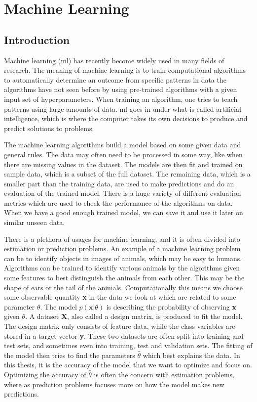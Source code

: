 \documentclass[a4paper, american, 12pt]{report}
\begin{document}
	
	\chapter{Machine Learning}
	\label{chap:Theory-Machine_learning}
	\section{Introduction}
	\label{sect:Theory-IntroML}
	Machine learning (\acrshort{ml}) has recently become widely used in many fields of research. The meaning of machine learning is to train computational algorithms to automatically determine an outcome from specific patterns in data the algorithms have not seen before by using pre-trained algorithms with a given input set of hyperparameters. When training an algorithm, one tries to teach patterns using large amounts of data. \acrshort{ml} goes in under what is called artificial intelligence, which is where the computer takes its own decisions to produce and predict solutions to problems. 
	
	The machine learning algorithms build a model based on some given data and general rules. The data may often need to be processed in some way, like when there are missing values in the dataset. The models are then fit and trained on sample data, which is a subset of the full dataset. The remaining data, which is a smaller part than the training data, are used to make predictions and do an evaluation of the trained model. There is a huge variety of different evaluation metrics which are used to check the performance of the algorithms on data. When we have a good enough trained model, we can save it and use it later on similar unseen data.
	
	There is a plethora of usages for machine learning, and it is often divided into estimation or prediction problems. An example of a machine learning problem can be to identify objects in images of animals, which may be easy to humans. Algorithms can be trained to identify various animals by the algorithms given some features to best distinguish the animals from each other. This may be the shape of ears or the tail of the animals. Computationally this means we choose some observable quantity \textbf{x} in the data we look at which are related to some parameter $\theta$. The model $p(\textbf{x}|\theta)$ is describing the probability of observing \textbf{x} given $\theta$. A dataset \textbf{X}, also called a design matrix, is produced to fit the model. The design matrix only consists of feature data, while the class variables are stored in a target vector \textbf{y}. These two datasets are often split into training and test sets, and sometimes even into training, test and validation sets. The fitting of the model then tries to find the parameters $\hat{\theta}$ which best explains the data. In this thesis, it is the accuracy of the model that we want to optimize and focus on. Optimizing the accuracy of $\hat{\theta}$ is often the concern with estimation problems, where as prediction problems focuses more on how the model makes new predictions.
	
\end{document}
